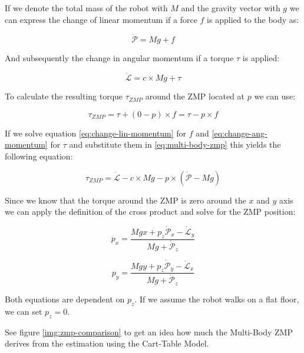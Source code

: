 \documentclass[english,ngerman]{KITreprt}
\begin{document}
If we denote the total mass of the robot with $M$ and the gravity vector
with $g$ we can express the change of linear momentum if a force $f$ is
applied to the body as:

\begin{equation} \label{eq:change-lin-momentum}
\dot{\mathcal{P}} = M g + f
\end{equation}

And subsequently the change in angular momentum if a torque $\tau$ is
applied:

\begin{equation} \label{eq:change-ang-momentum}
\dot{\mathcal{L}} = c \times Mg + \tau
\end{equation}

To calculate the resulting torque $\tau_{ZMP}$ around the ZMP located at
$p$ we can use:

\begin{equation} \label{eq:multi-body-zmp}
\tau_{ZMP} = \tau + (0 - p) \times f = \tau - p \times f
\end{equation}

If we solve equation \ref{eq:change-lin-momentum} for $f$ and
\ref{eq:change-ang-momentum} for $\tau$ and substitute them in
\ref{eq:multi-body-zmp} this yields the following equation:

\begin{equation}
\tau_{ZMP} = \dot{\mathcal{L}} - c \times M g - p \times (\dot{\mathcal{P}} - Mg)
\end{equation}

Since we know that the torque around the ZMP is zero around the $x$ and
$y$ axis we can apply the definition of the cross product and solve for
the ZMP position:

\begin{equation}
p_x = \frac{Mgx + p_z \dot{\mathcal{P}}_x - \dot{\mathcal{L}}_y}{Mg + \dot{\mathcal{P}}_z}
\end{equation}

\begin{equation}
p_y = \frac{Mgy + p_z \dot{\mathcal{P}}_y - \dot{\mathcal{L}}_x}{Mg + \dot{\mathcal{P}}_z}
\end{equation}

Both equations are dependent on $p_z$. If we assume the robot walks on a
flat floor, we can set $p_z = 0$.

See figure \ref{img:zmp-comparison} to get an idea how much the
Multi-Body ZMP derives from the estimation using the Cart-Table Model.
\end{document}
